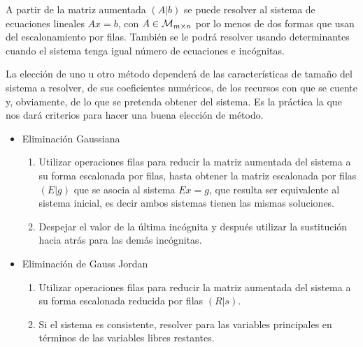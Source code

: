A partir de la matriz aumentada $(A| b)$ se puede resolver al sistema de ecuaciones lineales $Ax = b$, con $A\in \mathcal{M}_{m\times n}$ por lo menos de dos formas que usan del escalonamiento por filas. También se le podrá resolver usando determinantes cuando el sistema tenga igual número de ecuaciones e incógnitas.

La elección de uno u otro método dependerá de las características de tamaño del
sistema a resolver, de sus coeficientes numéricos, de los recursos con que se cuente y,
obviamente, de lo que se pretenda obtener del sistema. Es la práctica la que nos dará
criterios para hacer una buena elección de método.



\begin{itemize}
\item
Eliminación Gaussiana

\begin{enumerate}
\item
Utilizar operaciones filas para reducir la matriz aumentada del sistema a su forma escalonada por filas, hasta obtener la matriz escalonada por filas $(E| g)$ que se asocia al sistema $Ex=g$, que resulta ser equivalente al sistema inicial, es decir ambos sistemas tienen las mismas soluciones.

\item
Despejar el valor de la última incógnita y después utilizar la sustitución hacia atrás para las demás incógnitas.
\end{enumerate}

\item
Eliminación de Gauss Jordan

\begin{enumerate}
\item
Utilizar operaciones filas para reducir la matriz aumentada del sistema a su forma escalonada reducida por filas $(R| s)$.

\item
Si el sistema es consistente, resolver para las variables principales en términos de las variables libres restantes.
\end{enumerate}
\end{itemize}

